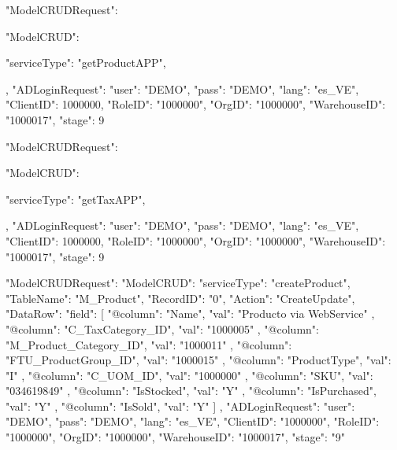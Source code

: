 


{
    "ModelCRUDRequest": {
        "ModelCRUD": {
            "serviceType": "getProductAPP",
           
        },
        "ADLoginRequest": {
            "user": "DEMO",
            "pass": "DEMO",
            "lang": "es_VE",
            "ClientID": 1000000,
            "RoleID": "1000000",
            "OrgID": "1000000",
            "WarehouseID": "1000017",
            "stage": 9
        }
    }
}




{
    "ModelCRUDRequest": {
        "ModelCRUD": {
            "serviceType": "getTaxAPP",
           
        },
        "ADLoginRequest": {
            "user": "DEMO",
            "pass": "DEMO",
            "lang": "es_VE",
            "ClientID": 1000000,
            "RoleID": "1000000",
            "OrgID": "1000000",
            "WarehouseID": "1000017",
            "stage": 9
        }
    }
}





{
    "ModelCRUDRequest": {
        "ModelCRUD": {
            "serviceType": "createProduct",
            "TableName": "M_Product",
            "RecordID": "0",
            "Action": "CreateUpdate",
            "DataRow": {
                "field": [
                    {
                        "@column": "Name",
                        "val": "Producto via WebService"
                    },
                    {
                        "@column": "C_TaxCategory_ID",
                        "val": "1000005"
                    },
                    {
                        "@column": "M_Product_Category_ID",
                        "val": "1000011"
                    },
                    {
                        "@column": "FTU_ProductGroup_ID",
                        "val": "1000015"
                    },
                    {
                        "@column": "ProductType",
                        "val": "I"
                    },
                    {
                        "@column": "C_UOM_ID",
                        "val": "1000000"
                    },
                    {
                        "@column": "SKU",
                        "val": "034619849"
                    },
                    {
                        "@column": "IsStocked",
                        "val": "Y"
                    },
                    {
                        "@column": "IsPurchased",
                        "val": "Y"
                    },
                    {
                        "@column": "IsSold",
                        "val": "Y"
                    }
                ]
            }
        },
        "ADLoginRequest": {
            "user": "DEMO",
            "pass": "DEMO",
            "lang": "es_VE",
            "ClientID": "1000000",
            "RoleID": "1000000",
            "OrgID": "1000000",
            "WarehouseID": "1000017",
            "stage": "9"
        }
    }
}




